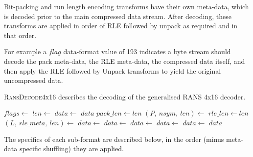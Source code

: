 \documentclass[a4paper]{article}
\begin{document}
Bit-packing and run length encoding transforms have their own
meta-data, which is decoded prior to the main compressed data stream.
After decoding, these transforms are applied in order of RLE followed
by unpack as required and in that order.

For example a $flag$ data-format value of 193 indicates a byte stream
should decode the pack meta-data, the RLE meta-data, the compressed
data itself, and then apply the RLE followed by Unpack transforms to
yield the original uncompressed data.

\textsc{RansDecode4x16} describes the decoding of the generalised RANS 4x16 decoder.

\begin{algorithmic}[1]
  \State $flags \gets $
    \State $len \gets$
  \EndIf
    \State $data \gets $
    \State \Return $data$
  \EndIf{}
  \Statex {}
    \State $pack\_len \gets len$
    \State $(P,\ nsym,\ len) \gets $
  \EndIf
    \State $rle\_len \gets len$
    \State $(L,\ rle\_meta,\ len) \gets $
  \EndIf
  \Statex {}
    \State $data \gets $
    \State $data \gets $
  \Else
    \State $data \gets $
  \EndIf
  \Statex {}
    \State $data \gets $
  \EndIf
    \State $data \gets $
  \EndIf
  \State \Return $data$
  \EndFunction
\end{algorithmic}

The specifics of each sub-format are described below, in the order (minus meta-data specific shuffling) they are applied.
\end{document}
